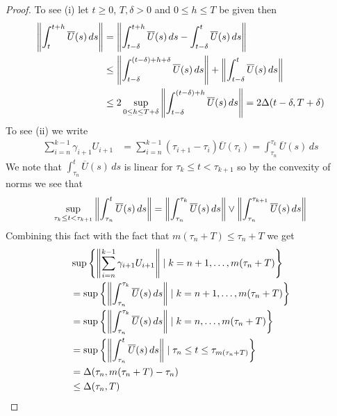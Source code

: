 \begin{proof}
To see (i) let $t \geq 0$, $T, \delta>0$ and $0 \leq h \leq T$ be given then
\begin{align*}
\left \lVert \int_t^{t+h}  \overline{U}(s) \, ds \right \rVert &=  \left \lVert \int_{t-\delta}^{t+h}\overline{U}(s) \, ds - \int_{t-\delta}^t \overline{U}(s) \, ds \right \rVert \\
&\leq \left \lVert \int_{t-\delta}^{(t-\delta)+h+\delta}\overline{U}(s) \, ds \right \rVert + \left \lVert \int_{t-\delta}^t \overline{U}(s) \, ds \right \rVert \\
&\leq 2 \sup_{0 \leq h \leq T+\delta} \left \lVert \int_{t-\delta}^{(t-\delta)+h}\overline{U}(s) \, ds \right \rVert = 2 \Delta(t-\delta, T+\delta)
\end{align*}
To see (ii) we write
\begin{align*}
\sum_{i=n}^{k-1} \gamma_{i+1} U_{i + 1} &= \sum_{i=n}^{k-1} (\tau_{i+1} - \tau_i) \overline{U}(\tau_i) = \int_{\tau_n}^{\tau_k} \overline{U}(s) \, ds
\end{align*}
We note that $\int_{\tau_n}^{t} \overline{U}(s) \, ds$ is linear for $\tau_k \leq t < \tau_{k+1}$ so by the convexity of norms we see that 
\begin{align*}
\sup_{\tau_k \leq t < \tau_{k+1}} \left \lVert \int_{\tau_n}^{t} \overline{U}(s) \, ds  \right \rVert = \left \lVert \int_{\tau_n}^{\tau_k} \overline{U}(s) \, ds \right \rVert \vee \left \lVert \int_{\tau_n}^{\tau_{k+1}} \overline{U}(s) \, ds \right \rVert
\end{align*}
Combining this fact with the fact that $m(\tau_n+T) \leq \tau_n+T$ we get
\begin{align*}
&\sup \left \lbrace \left \lVert \sum_{i=n}^{k-1} \gamma_{i+1} U_{i + 1} \right \rVert \mid k=n+1, \dotsc, m(\tau_n+T) \right \rbrace  \\
&= \sup \left \lbrace \left \lVert \int_{\tau_n}^{\tau_k} \overline{U}(s) \, ds \right \rVert \mid k=n+1, \dotsc, m(\tau_n+T) \right \rbrace \\
&= \sup \left \lbrace \left \lVert \int_{\tau_n}^{\tau_k} \overline{U}(s) \, ds \right \rVert \mid k=n, \dotsc, m(\tau_n+T) \right \rbrace \\
&= \sup \left \lbrace \left \lVert \int_{\tau_n}^{t} \overline{U}(s) \, ds \right \rVert \mid \tau_{n} \leq t \leq \tau_{m(\tau_n+T)} \right \rbrace \\
&= \Delta(\tau_n, m(\tau_n+T) - \tau_n) \\
&\leq \Delta(\tau_n, T)
\end{align*}


\end{proof}
